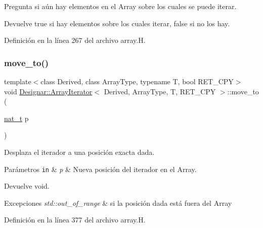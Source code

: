 Pregunta si aún hay elementos en el Array sobre los cuales se puede iterar. 

\begin{DoxyReturn}{Devuelve}
{\ttfamily true} si hay elementos sobre los cuales iterar, {\ttfamily false} si no los hay. 
\end{DoxyReturn}


Definición en la línea 267 del archivo array.\+H.

\mbox{\label{class_designar_1_1_array_iterator_a68f6d13686360c93d95b3a875b14312e}} 
\subsubsection{\texorpdfstring{move\+\_\+to()}{move\_to()}}
{\footnotesize\ttfamily template$<$class Derived, class Array\+Type, typename T, bool R\+E\+T\+\_\+\+C\+PY$>$ \\
void \hyperlink{class_designar_1_1_array_iterator}{Designar\+::\+Array\+Iterator}$<$ Derived, Array\+Type, T, R\+E\+T\+\_\+\+C\+PY $>$\+::move\+\_\+to (\begin{DoxyParamCaption}\item[{\hyperlink{namespace_designar_aa72662848b9f4815e7bf31a7cf3e33d1}{nat\+\_\+t}}]{p }\end{DoxyParamCaption})\hspace{0.3cm}{\ttfamily [inline]}}



Desplaza el iterador a una posición exacta dada. 


\begin{DoxyParams}[1]{Parámetros}
\mbox{\tt in}  & {\em p} & Nueva posición del iterador en el Array. \\
\hline
\end{DoxyParams}
\begin{DoxyReturn}{Devuelve}
void. 
\end{DoxyReturn}

\begin{DoxyExceptions}{Excepciones}
{\em std\+::out\+\_\+of\+\_\+range} & si la posición dada está fuera del Array \\
\hline
\end{DoxyExceptions}


Definición en la línea 377 del archivo array.\+H.

